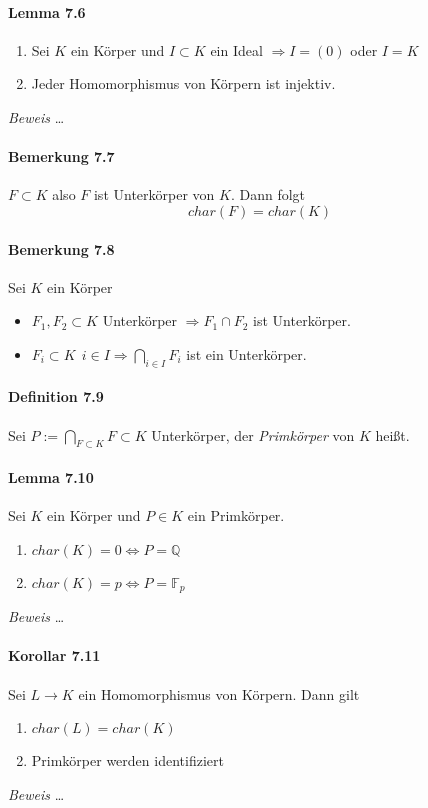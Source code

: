 \documentclass{scrartcl}
\newcommand{\Q}{\mathbb{Q}}
\begin{document}
\paragraph{Lemma 7.6}
\begin{enumerate}{}
\item Sei $K$ ein Körper und $I\subset K$ ein Ideal $\Rightarrow I=(0)$ oder
  $I=K$
\item Jeder Homomorphismus von Körpern ist injektiv.
\end{enumerate}
\textit{Beweis} \dots

\paragraph{Bemerkung 7.7}
$F\subset K$ also $F$ ist Unterkörper von $K$. Dann folgt
\[
  char(F)=char(K)
\]

\paragraph{Bemerkung 7.8}
Sei $K$ ein Körper
\begin{itemize}{}
\item $F_1,F_2\subset K$ Unterkörper $\Rightarrow F_1\cap F_2$ ist Unterkörper.
\item $F_i\subset K~~i\in I \Rightarrow \bigcap_{i\in I}F_i$ ist ein Unterkörper.
\end{itemize}

\paragraph{Definition 7.9}
Sei $P := \bigcap_{F\subset K}F\subset K$ Unterkörper, der \textit{Primkörper}
von $K$ heißt.

\paragraph{Lemma 7.10}
Sei $K$ ein Körper und $P\in K$ ein Primkörper.
\begin{enumerate}{}
\item $char(K)=0\Leftrightarrow P=\Q$
\item $char(K)=p\Leftrightarrow P=\mathbb{F}_p$
\end{enumerate}
\textit{Beweis} \dots

\paragraph{Korollar 7.11}
Sei $L\to K$ ein Homomorphismus von Körpern. Dann gilt
\begin{enumerate}{}
\item $char(L)=char(K)$
\item Primkörper werden identifiziert
\end{enumerate}
\textit{Beweis} \dots
\end{document}
